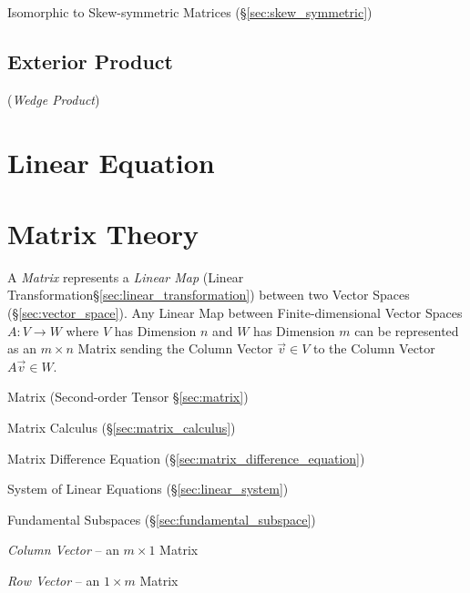 Isomorphic to Skew-symmetric Matrices (\S\ref{sec:skew_symmetric})



\subsection{Exterior Product}\label{sec:exterior_product}

(\emph{Wedge Product})



\section{Linear Equation}\label{sec:linear_equation}

\section{Matrix Theory}\label{sec:matrix_theory}


A \emph{Matrix} represents a \emph{Linear Map} (Linear
Transformation\S\ref{sec:linear_transformation}) between
two Vector Spaces (\S\ref{sec:vector_space}). Any Linear Map between
Finite-dimensional Vector Spaces $A : V \rightarrow W$ where $V$ has Dimension
$n$ and $W$ has Dimension $m$ can be represented as an $m \times n$ Matrix
sending the Column Vector $\vec{v} \in V$ to the Column Vector $A\vec{v} \in
W$.

\fist Matrix (Second-order Tensor \S\ref{sec:matrix})

\fist Matrix Calculus (\S\ref{sec:matrix_calculus})

\fist Matrix Difference Equation (\S\ref{sec:matrix_difference_equation})

\fist System of Linear Equations (\S\ref{sec:linear_system})

\fist Fundamental Subspaces (\S\ref{sec:fundamental_subspace})

\emph{Column Vector} -- an $m \times 1$ Matrix

\emph{Row Vector} -- an $1 \times m$ Matrix

